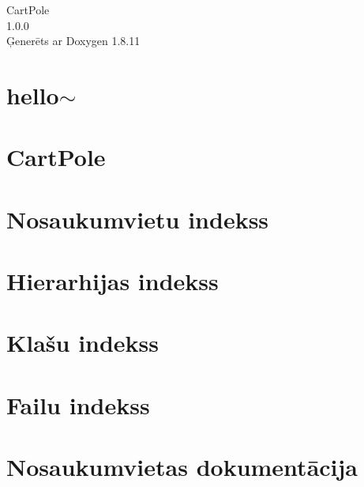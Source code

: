 \documentclass[twoside]{book}
\newcommand{\+}{\discretionary{\mbox{\scriptsize$\hookleftarrow$}}{}{}}
\newcommand{\clearemptydoublepage}{%
  \newpage{\pagestyle{empty}\cleardoublepage}%
}
\begin{document}
\hypersetup{pageanchor=false,
             bookmarksnumbered=true,
             pdfencoding=unicode
            }
\begin{titlepage}
\vspace*{7cm}
\begin{center}%
{\Large Cart\+Pole \\[1ex]\large 1.\+0.\+0 }\\
\vspace*{1cm}
{\large Ģenerēts ar Doxygen 1.8.11}\\
\end{center}
\end{titlepage}
\clearemptydoublepage
\tableofcontents
\clearemptydoublepage
{}
\hypersetup{pageanchor=true}

\chapter{hello$\sim$}
\label{index}\hypertarget{index}{}
\chapter{Cart\+Pole}
\label{md_README}
\hypertarget{md_README}{}

\chapter{Nosaukumvietu indekss}

\chapter{Hierarhijas indekss}

\chapter{Klašu indekss}

\chapter{Failu indekss}

\chapter{Nosaukumvietas dokumentācija}














\end{document}

